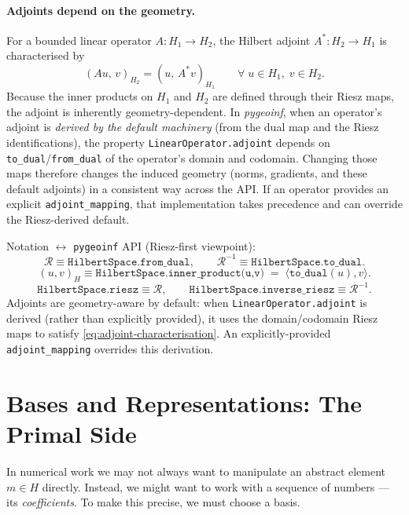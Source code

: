 \documentclass[11pt,twoside,openright]{book}
\theoremstyle{plain}
\theoremstyle{definition}
\theoremstyle{remark}
\newcommand{\pair}[2]{\langle #1, #2\rangle}
\newcommand{\Riesz}{\mathcal{R}}
\begin{document}
\paragraph{Adjoints depend on the geometry.}
For a bounded linear operator $A : H_1 \to H_2$, the Hilbert adjoint
$A^* : H_2 \to H_1$ is characterised by
\begin{equation}
  \label{eq:adjoint-characterisation}
  (A u,\, v)_{H_2} = (u,\, A^* v)_{H_1}
  \qquad \forall\; u \in H_1,\; v \in H_2.
\end{equation}
Because the inner products on $H_1$ and $H_2$ are defined through their Riesz
maps, the adjoint is inherently geometry-dependent. In \textit{pygeoinf}, when an
operator's adjoint is \emph{derived by the default machinery} (from the dual map
and the Riesz identifications), the property \texttt{LinearOperator.adjoint}
depends on \texttt{to\_dual}/\texttt{from\_dual} of the operator's domain and
codomain. Changing those maps therefore changes the induced geometry (norms,
gradients, and these default adjoints) in a consistent way across the API.
If an operator provides an explicit \texttt{adjoint\_mapping}, that
implementation takes precedence and can override the Riesz-derived default.

\begin{codebox}
Notation \(\leftrightarrow\) \texttt{pygeoinf} API (Riesz-first viewpoint):
\[
  \Riesz \equiv \texttt{HilbertSpace.from\_dual}, \qquad
  \Riesz^{-1} \equiv \texttt{HilbertSpace.to\_dual}.
\]
\[
  (u,v)_H \equiv \texttt{HilbertSpace.inner\_product(u,v)}
  \;=\; \pair{\texttt{to\_dual}(u)}{v}.
\]
\[
  \texttt{HilbertSpace.riesz} \equiv \Riesz, \qquad
  \texttt{HilbertSpace.inverse\_riesz} \equiv \Riesz^{-1}.
\]
Adjoints are geometry-aware by default: when \texttt{LinearOperator.adjoint} is
derived (rather than explicitly provided), it uses the domain/codomain Riesz
maps to satisfy \eqref{eq:adjoint-characterisation}. An explicitly-provided
\texttt{adjoint\_mapping} overrides this derivation.
\end{codebox}


\section{Bases and Representations: The Primal Side}

In numerical work we may not always want to manipulate an abstract element
$m \in H$ directly.
Instead, we might want to work with a sequence of numbers --- its \emph{coefficients}.
To make this precise, we must choose a basis.
\end{document}
